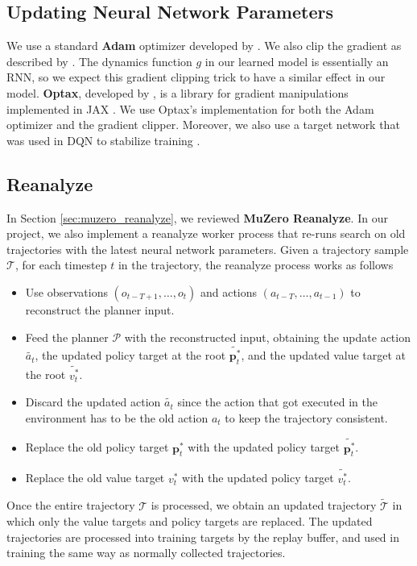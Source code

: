 \subsection{Updating Neural Network Parameters}
We use a standard \textbf{Adam} optimizer developed by \citeauthor{AdamMethodStochastic_Kingma.Ba_2017} \cite{AdamMethodStochastic_Kingma.Ba_2017}.
We also clip the gradient as described by \citeauthor{DifficultyTrainingRecurrent_Pascanu.Mikolov.ea_} \cite{DifficultyTrainingRecurrent_Pascanu.Mikolov.ea_}.
The dynamics function $g$ in our learned model is essentially an RNN, so we expect this gradient clipping trick to have a similar effect in our model.
\textbf{Optax}, developed by \citeauthor{OptaxComposableGradient_MatteoHessel.DavidBudden.ea_2020}, is a library for gradient manipulations implemented in JAX \cite{OptaxComposableGradient_MatteoHessel.DavidBudden.ea_2020}.
We use Optax's implementation for both the Adam optimizer and the gradient clipper.
Moreover, we also use a target network that was used in DQN to stabilize training \cite{PlayingAtariDeep_Mnih.Kavukcuoglu.ea_2013}.

\subsection{Reanalyze} \label{sec:reanalyze}
In Section \ref{sec:muzero_reanalyze}, we reviewed \textbf{MuZero Reanalyze}.
In our project, we also implement a reanalyze worker process that re-runs search on old trajectories with the latest neural network parameters.
Given a trajectory sample $\mathcal{T}$, for each timestep $t$ in the trajectory, the reanalyze process works as follows
\begin{itemize}
    \item Use observations $(o_{t - T + 1}, \dots, o_{t})$ and actions $(a_{t - T}, \dots, a_{t - 1})$ to reconstruct the planner input.
    \item Feed the planner $\mathcal{P}$ with the reconstructed input, obtaining the update action $\tilde{a_t}$, the updated policy target at the root $\tilde{\mathbf{p}^*_t}$, and the updated value target at the root $\tilde{v^*_t}$.
    \item Discard the updated action $\tilde{a_t}$ since the action that got executed in the environment has to be the old action $a_t$ to keep the trajectory consistent.
    \item Replace the old policy target $\mathbf{p}^*_t$ with the updated policy target $\tilde{\mathbf{p}^*_t}$.
    \item Replace the old value target $v^*_t$ with the updated policy target $\tilde{v^*_t}$.
\end{itemize}
Once the entire trajectory $\mathcal{T}$ is processed, we obtain an updated trajectory $\tilde{\mathcal{T}}$ in which only the value targets and policy targets are replaced.
The updated trajectories are processed into training targets by the replay buffer, and used in training the same way as normally collected trajectories.

